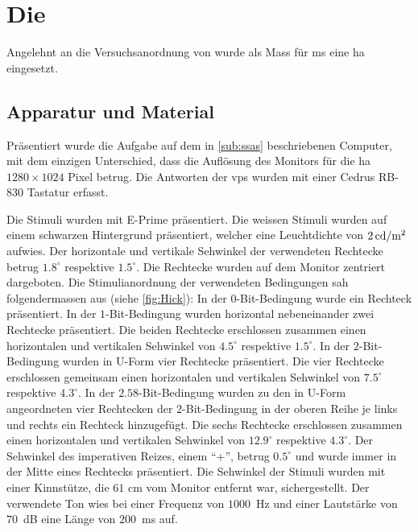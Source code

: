 \documentclass[11pt, twoside, a4paper]{book}		%
\begin{document}
\section{Die \label{sec:Hick}}

Angelehnt an die Versuchsanordnung von \citet{Rammsayer2007} wurde als Mass für \gls{ms} eine \gls{ha} eingesetzt.

\subsection{Apparatur und Material \label{sub:}}
Präsentiert wurde die Aufgabe auf dem in \autoref{sub:ssas} beschriebenen Computer, mit dem einzigen Unterschied, dass die Auflösung des Monitors für die \gls{ha} $1280 \times 1024$ Pixel betrug. Die Antworten der \glspl{vp} wurden mit einer Cedrus RB-830 Tastatur erfasst. 

Die Stimuli wurden mit E-Prime\textsuperscript{\textregistered} \citep{eprime} präsentiert. Die weissen Stimuli wurden auf einem schwarzen Hintergrund präsentiert, welcher eine Leuchtdichte von $2\,\textnormal{cd}/ \textnormal{m}^2$ aufwies. Der horizontale und vertikale Sehwinkel der verwendeten Rechtecke betrug $1.8^{\circ}$ respektive $1.5^{\circ}$. Die Rechtecke wurden auf dem Monitor zentriert dargeboten. Die Stimulianordnung der verwendeten Bedingungen sah folgendermassen aus (siehe \autoref{fig:Hick}):  In der $0$-Bit-Bedingung wurde ein Rechteck präsentiert. In der $1$-Bit-Bedingung wurden horizontal nebeneinander zwei Rechtecke präsentiert. Die beiden Rechtecke erschlossen zusammen einen horizontalen und vertikalen Sehwinkel von $4.5^{\circ}$ respektive $1.5^{\circ}$. In der $2$-Bit-Bedingung wurden in U-Form vier Rechtecke präsentiert. Die vier Rechtecke erschlossen gemeinsam einen horizontalen und vertikalen Sehwinkel von $7.5^{\circ}$ respektive $4.3^{\circ}$. In der $2.58$-Bit-Bedingung wurden zu den in U-Form angeordneten vier Rechtecken der $2$-Bit-Bedingung in der oberen Reihe je links und rechts ein Rechteck hinzugefügt. Die sechs Rechtecke erschlossen zusammen einen horizontalen und vertikalen Sehwinkel von $12.9^{\circ}$ respektive $4.3^{\circ}$. Der Sehwinkel des imperativen Reizes, einem \enquote{+}, betrug $0.5^{\circ}$ und wurde  immer in der Mitte eines Rechtecks präsentiert. Die Sehwinkel der Stimuli wurden mit einer Kinnstütze, die $61$ cm vom Monitor entfernt war, sichergestellt. Der verwendete Ton wies bei einer Frequenz von $1000$~Hz und einer Lautstärke von $70$~dB eine Länge von $200$~ms auf.
\end{document}
